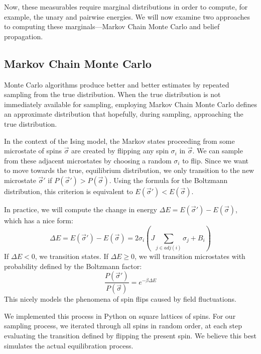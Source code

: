 \documentclass{article}
\begin{document}
Now, these measurables require marginal distributions in order to compute, for 
example, the unary and pairwise energies. 
We will now examine two approaches to computing these marginals—Markov Chain 
Monte Carlo and belief propagation. 
%
%
%
%
%
\subsection{Markov Chain Monte Carlo}
%
%
%
%
%
Monte Carlo algorithms produce better and better estimates by repeated sampling 
from the true distribution. 
When the true distribution is not immediately available for sampling, employing 
Markov Chain Monte Carlo defines an approximate distribution that hopefully, 
during sampling, approaching the true distribution. 

In the context of the Ising model, the Markov states proceeding from some 
microstate of spins $\vec{\sigma}$ are created by flipping any spin $\sigma_i$ in 
$\vec{\sigma}$. 
We can sample from these adjacent microstates by choosing a random $\sigma_i$ to 
flip. 
Since we want to move towards the true, equilibrium distribution, we only 
transition to the new microstate $\vec{\sigma}'$ if 
$P(\vec{\sigma}') > P(\vec{\sigma})$. 
Using the formula for the Boltzmann distribution, this criterion is equivalent 
to $E(\vec{\sigma}') < E(\vec{\sigma})$. 

In practice, we will compute the change in energy 
$\Delta E = E(\vec{\sigma}') - E(\vec{\sigma})$, which has a nice form:
\[
    \Delta E = E(\vec{\sigma}') - E(\vec{\sigma}) = 2 \sigma_i (J \sum_{j \in adj(i)} \sigma_j + B_i)
\]
If $\Delta E < 0$, we transition states. 
If $\Delta E \geq 0$, we will transition microstates with probability defined by 
the Boltzmann factor:
\[
    \frac{P(\vec{\sigma}')}{P(\vec{\sigma})}
    = e^{-\beta \Delta E} 
\]
This nicely models the phenomena of spin flips caused by field fluctuations. 

We implemented this process in Python on square lattices of spins. 
For our sampling process, we iterated through all spins in random order, at each 
step evaluating the transition defined by flipping the present spin. 
We believe this best simulates the actual equilibration process. 
\end{document}
